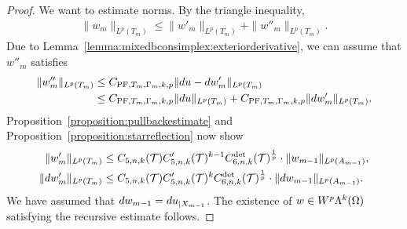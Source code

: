 \documentclass[10pt,a4paper]{article}
\begin{document}
\begin{proof}
    We want to estimate norms. By the triangle inequality, 
    \begin{align*}
        \| w_{m} \|_{L^{p}(T_{m})}
        \leq  
        \| w'_{m} \|_{L^{p}(T_{m})}
        + 
        \| w''_{m} \|_{L^{p}(T_{m})}
        .
    \end{align*}
    Due to Lemma~\ref{lemma:mixedbconsimplex:exteriorderivative},
    we can assume that $w''_{m}$ satisfies 
    \begin{align*}
        \| w''_{m} \|_{L^{p}(T_{m})} 
        &
        \leq 
        C_{{\rm PF},T_{m},\Gamma_{m},k,p} \| d u - d w'_{m} \|_{L^{p}(T_{m})}
        \\&
        \leq 
        C_{{\rm PF},T_{m},\Gamma_{m},k,p} \| d u      \|_{L^{p}(T_{m})} 
        + 
        C_{{\rm PF},T_{m},\Gamma_{m},k,p} \| d w'_{m} \|_{L^{p}(T_{m})} 
        .
    \end{align*}
    Proposition~\ref{proposition:pullbackestimate} and Proposition~\ref{proposition:starreflection} now show 
    \begin{align*}
        \| w'_{m} \|_{L^{p}(T_{m})}
        &\leq 
        C_{5,n,k}({\mathcal T})
        C'_{5,n,k}({\mathcal T})^{k-1}
        C^{\det}_{6,n,k}({\mathcal T})^{\frac 1 p}
        \cdot 
        \| w_{m-1} \|_{L^{p}(A_{m-1})}
        ,
        \\
        \| d w'_{m} \|_{L^{p}(T_{m})}
        &\leq 
        C_{5,n,k}({\mathcal T})
        C'_{5,n,k}({\mathcal T})^{k}
        C^{\det}_{6,n,k}({\mathcal T})^{\frac 1 p}
        \cdot 
        \| d w_{m-1} \|_{L^{p}(A_{m-1})}
        .
    \end{align*}
    We have assumed that $d w_{m-1} = d u_{|X_{m-1}}$. 
    The existence of $w \in W^{p}\Lambda^{k}(\Omega)$ satisfying the recursive estimate follows. 
\end{proof}
\end{document}
